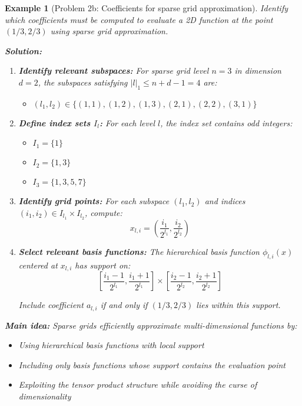 \documentclass[11pt,a4paper]{article}
\newtheorem{example}[theorem]{Example}
\begin{document}
\begin{example}[Problem 2b: Coefficients for sparse grid approximation]
    Identify which coefficients must be computed to evaluate a 2D function at the point $(1/3, 2/3)$ using sparse grid approximation.
    
    \textbf{Solution:}
    \begin{enumerate}
        \item \textbf{Identify relevant subspaces:} For sparse grid level $n = 3$ in dimension $d = 2$, the subspaces satisfying $|l|_1 \leq n + d - 1 = 4$ are:
        \begin{itemize}
            \item $(l_1, l_2) \in \{(1,1), (1,2), (1,3), (2,1), (2,2), (3,1)\}$
        \end{itemize}
        
        \item \textbf{Define index sets $I_l$:} For each level $l$, the index set contains odd integers:
        \begin{itemize}
            \item $I_1 = \{1\}$
            \item $I_2 = \{1, 3\}$
            \item $I_3 = \{1, 3, 5, 7\}$
        \end{itemize}
        
        \item \textbf{Identify grid points:} For each subspace $(l_1, l_2)$ and indices $(i_1, i_2) \in I_{l_1} \times I_{l_2}$, compute:
        $$x_{l,i} = \left(\frac{i_1}{2^{l_1}}, \frac{i_2}{2^{l_2}}\right)$$
        
        \item \textbf{Select relevant basis functions:} The hierarchical basis function $\phi_{l,i}(x)$ centered at $x_{l,i}$ has support on:
        $$\left[\frac{i_1-1}{2^{l_1}}, \frac{i_1+1}{2^{l_1}}\right] \times \left[\frac{i_2-1}{2^{l_2}}, \frac{i_2+1}{2^{l_2}}\right]$$
        
        Include coefficient $a_{l,i}$ if and only if $(1/3, 2/3)$ lies within this support.
    \end{enumerate}
    
    \textbf{Main idea:} Sparse grids efficiently approximate multi-dimensional functions by:
    \begin{itemize}
        \item Using hierarchical basis functions with local support
        \item Including only basis functions whose support contains the evaluation point
        \item Exploiting the tensor product structure while avoiding the curse of dimensionality
    \end{itemize}
    

\end{example}
\end{document}
